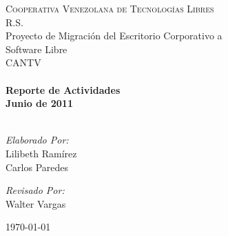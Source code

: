 \begin{titlepage}
\begin{center}

\textsc{\LARGE Cooperativa Venezolana de Tecnologías Libres \\R.S.}\\[1.5cm]

{\Large Proyecto de Migración del Escritorio Corporativo a \\Software
Libre \\[0.2cm]CANTV}\\[0.5cm]


\HRule \\[0.4cm] { \huge \bfseries Reporte de Actividades }\\[0.4cm]
{ \large \bfseries Junio de 2011 }\\[0.4cm]

\HRule \\[3cm]

\begin{minipage}{0.4\textwidth}
\begin{flushleft} \large
\emph{Elaborado Por:}\\
Lilibeth Ramírez\\
Carlos Paredes
\end{flushleft}
\end{minipage}
\begin{minipage}{0.4\textwidth}
\begin{flushright} \large
\emph{Revisado Por:} \\
Walter Vargas
\end{flushright}
\end{minipage}

\vfill

{\large \today}

\end{center}

\end{titlepage}
